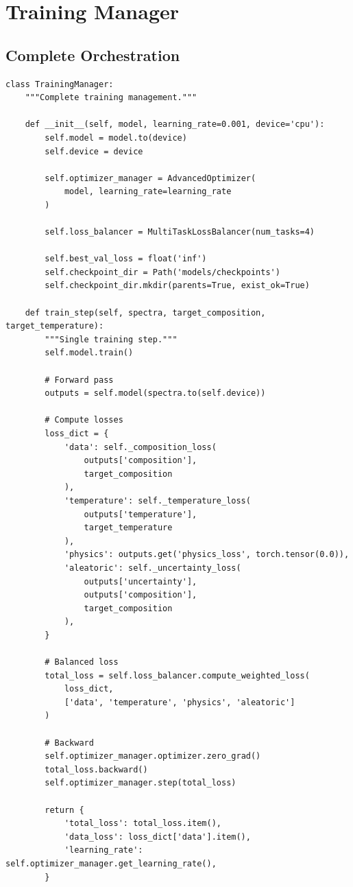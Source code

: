 \documentclass[12pt,a4paper,oneside]{report}
\begin{document}
\section{Training Manager}

\subsection{Complete Orchestration}

\begin{lstlisting}
class TrainingManager:
    """Complete training management."""

    def __init__(self, model, learning_rate=0.001, device='cpu'):
        self.model = model.to(device)
        self.device = device

        self.optimizer_manager = AdvancedOptimizer(
            model, learning_rate=learning_rate
        )

        self.loss_balancer = MultiTaskLossBalancer(num_tasks=4)

        self.best_val_loss = float('inf')
        self.checkpoint_dir = Path('models/checkpoints')
        self.checkpoint_dir.mkdir(parents=True, exist_ok=True)

    def train_step(self, spectra, target_composition, target_temperature):
        """Single training step."""
        self.model.train()

        # Forward pass
        outputs = self.model(spectra.to(self.device))

        # Compute losses
        loss_dict = {
            'data': self._composition_loss(
                outputs['composition'],
                target_composition
            ),
            'temperature': self._temperature_loss(
                outputs['temperature'],
                target_temperature
            ),
            'physics': outputs.get('physics_loss', torch.tensor(0.0)),
            'aleatoric': self._uncertainty_loss(
                outputs['uncertainty'],
                outputs['composition'],
                target_composition
            ),
        }

        # Balanced loss
        total_loss = self.loss_balancer.compute_weighted_loss(
            loss_dict,
            ['data', 'temperature', 'physics', 'aleatoric']
        )

        # Backward
        self.optimizer_manager.optimizer.zero_grad()
        total_loss.backward()
        self.optimizer_manager.step(total_loss)

        return {
            'total_loss': total_loss.item(),
            'data_loss': loss_dict['data'].item(),
            'learning_rate': self.optimizer_manager.get_learning_rate(),
        }
\end{lstlisting}
\end{document}
